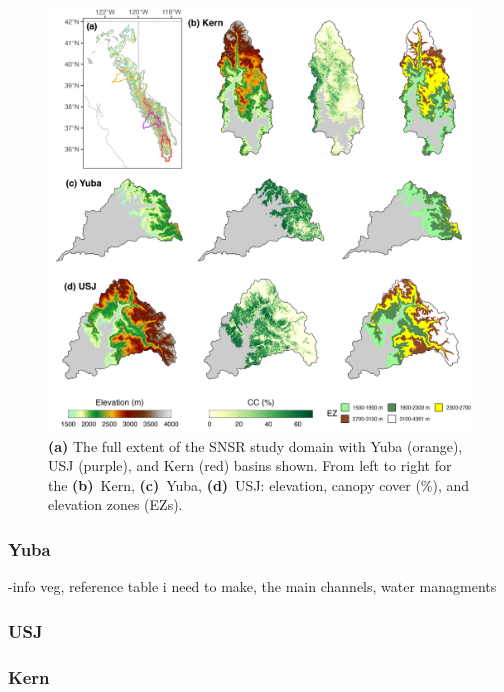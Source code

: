 \begin{figure}[t]
\centering
\includegraphics[width=14cm]{figures/ch2_figs/kuy_study_area_v2.png}
\caption{\textbf{(a)} The full extent of the SNSR study domain with Yuba (orange), USJ (purple), and Kern (red) basins shown. From left to right for the \textbf{(b)}~Kern, \textbf{(c)}~Yuba, \textbf{(d)}~USJ: elevation, canopy cover (\%), and elevation zones (EZs).}
\label{kuy_study_area}
\end{figure}
\hypertarget{ch2-sa-1}{\subsubsection{Yuba}\label{ch2-sa-1}}

-info veg, reference table i need to make, the main channels, water managments

\hypertarget{ch2-sa-2}{\subsubsection{USJ}\label{ch2-sa-2}}


\hypertarget{ch2-sa-3}{\subsubsection{Kern}\label{ch2-sa-3}}


